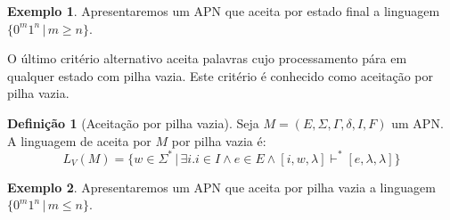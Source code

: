 \documentclass[a4paper]{article}
\theoremstyle{definition}
\newtheorem{Example}{Exemplo}
\newtheorem{Definition}{Definição}
\begin{document}
  \begin{Example}
    Apresentaremos um APN que aceita por estado final a linguagem
    $\{0^m1^n\,|\,m \geq n\}$.
    \begin{figure}[H]
      \centering
    \end{figure}
  \end{Example}
  
  O último critério alternativo aceita palavras cujo processamento pára em
  qualquer estado com pilha vazia. Este critério é conhecido como aceitação por
  pilha vazia.
  \begin{Definition}[Aceitação por pilha vazia]
    Seja $M = (E,\Sigma,\Gamma,\delta,I,F)$ um APN. A linguagem de aceita por $M$
    por pilha vazia é:
    \[
      L_V(M) = \{w\in\Sigma^*\,|\,\exists i. i\in I \land
      e \in E\land [i,w,\lambda]\vdash^*[e,\lambda,\lambda]\}
    \]
  \end{Definition}

  \begin{Example}
    Apresentaremos um APN que aceita por pilha vazia a linguagem
    $\{0^m1^n\,|\,m \leq n\}$.
    \begin{figure}[H]
      \centering
    \end{figure}
  \end{Example}
\end{document}
